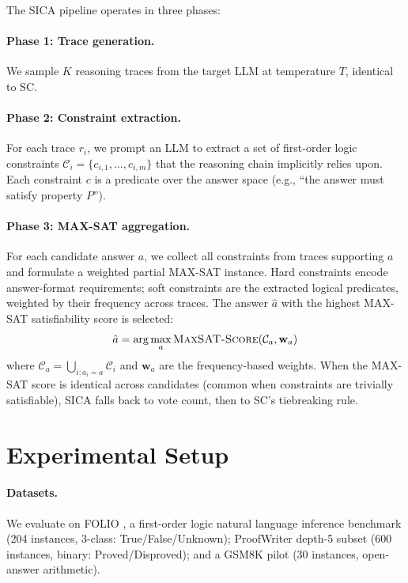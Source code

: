 \documentclass[11pt,a4paper]{article}
\begin{document}
The SICA pipeline operates in three phases:

\paragraph{Phase 1: Trace generation.}
We sample $K$ reasoning traces from the target LLM at temperature $T$, identical to SC.

\paragraph{Phase 2: Constraint extraction.}
For each trace $r_i$, we prompt an LLM to extract a set of first-order logic constraints $\mathcal{C}_i = \{c_{i,1}, \dots, c_{i,m}\}$ that the reasoning chain implicitly relies upon.
Each constraint $c$ is a predicate over the answer space (e.g., ``the answer must satisfy property $P$'').

\paragraph{Phase 3: MAX-SAT aggregation.}
For each candidate answer $a$, we collect all constraints from traces supporting $a$ and formulate a weighted partial MAX-SAT instance.
Hard constraints encode answer-format requirements; soft constraints are the extracted logical predicates, weighted by their frequency across traces.
The answer $\hat{a}$ with the highest MAX-SAT satisfiability score is selected:
\begin{equation}
\hat{a} = \arg\max_a \textsc{MaxSAT\text{-}Score}(\mathcal{C}_a, \mathbf{w}_a)
\end{equation}
where $\mathcal{C}_a = \bigcup_{i: a_i=a} \mathcal{C}_i$ and $\mathbf{w}_a$ are the frequency-based weights.
When the MAX-SAT score is identical across candidates (common when constraints are trivially satisfiable), SICA falls back to vote count, then to SC's tiebreaking rule.

\section{Experimental Setup}
\label{sec:setup}

\paragraph{Datasets.}
We evaluate on FOLIO \cite{han2022folio}, a first-order logic natural language inference benchmark (204 instances, 3-class: True/False/Unknown);
ProofWriter \cite{tafjord2021proofwriter} depth-5 subset (600 instances, binary: Proved/Disproved);
and a GSM8K \cite{cobbe2021gsm8k} pilot (30 instances, open-answer arithmetic).
\end{document}
